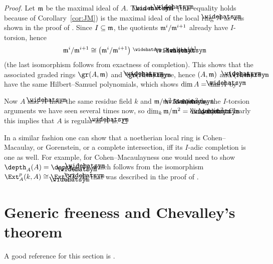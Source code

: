 \documentclass[a4paper,parskip=half,numbers=enddot, DIV=12]{scrreprt}
\begin{document}
\begin{proof}
	Let $\mathfrak{m}$ be the maximal ideal of $A$. Then $\roof{\mm}=\mm\roof{A}$ (this equality holds because of Corollary~\ref{cor:JM}) is the maximal ideal of the local ring $\roof{A}$ as was shown in the proof of \cite[Corollary~2.2.2]{homalg}. Since $I\subseteq \mathfrak{m}$, the quotients $\mathfrak{m}^i/\mathfrak{m}^{i+1}$ already have $I$-torsion, hence 
	\begin{align*}
		\mm^i/\mm^{i+1}\cong \left(\mm^i/\mm^{i+1}\right)^\complete\cong \roof{\mm}^i/\roof{\mm}^{i+1}
	\end{align*}
	(the last isomorphism follows from exactness of completion). This shows that the associated graded rings $\gr(A,\mm)$ and $\gr(\roof{A},\roof{\mm})$ agree, hence $(A,\mathfrak{m})$ and $(\roof{A},\roof{\mm})$ have the same Hilbert--Samuel polynomials, which shows $\dim A=\dim\roof{A}$ by \cite[Theorem~20]{alg2}.
	
	Now $A$ and $\roof{A}$ have the same residue field $k$ and $\mm/\mm^2\cong \roof{\mm}/\roof{\mm}^2$ by the $I$-torsion arguments we have seen several times now, so $\dim_k\mm/\mm^2=\dim_k\roof{\mm}/\roof{\mm}^2$. Clearly this implies that $A$ is regular iff $\roof{A}$ is.
\end{proof}
\begin{rem}
	In a similar fashion one can show that a noetherian local ring is Cohen--Macaulay, or Gorenstein, or a complete intersection, iff its $I$-adic completion is one as well. For example, for Cohen--Macaulayness one would need to show $\depth_A(A)=\depth_{\roof{A}}(\roof{A})$, which follows from the isomorphism $\Ext_A^p(k,A)\cong\Ext_{\roof{A}}^p(k,\roof{A})$ that was described in the proof of \cite[Proposition~2.4.2]{homalg}.
\end{rem}
\section{Generic freeness and Chevalley's theorem}
A good reference for this section is \cite[Section~14.2 and 14.3]{eisenbudCommAlg}. 
\end{document}
